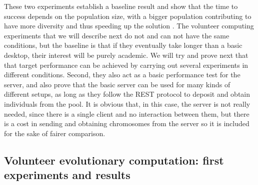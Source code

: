 \documentclass[letterpaper]{article}
\begin{document}
These two experiments establish a baseline result and show that
the time to success depends on the population size, with a bigger population
contributing to have more diversity and thus speeding up the solution \citep{DBLP:conf/lion/LaredoDFGB13}. The volunteer computing
experiments that we will describe next do not and can not have the
same conditions, but
the baseline is that if they eventually take longer than a basic
desktop, their interest will be purely academic. We will try and
prove next that that target performance can be achieved by carrying
out several experiments in different conditions. Second, they also act
as a basic performance test for the server, and also prove that the
basic server can be used for many kinds of different setups, as long
as they follow the REST protocol to deposit and obtain individuals
from the pool. It is obvious that, in this case, the server is not
really needed, since there is a single client and no interaction
between them, but there is a cost in sending and obtaining chromosomes
from the server so it is included for the sake of fairer comparison.

\subsection{Volunteer evolutionary computation: first experiments and results}
\end{document}
